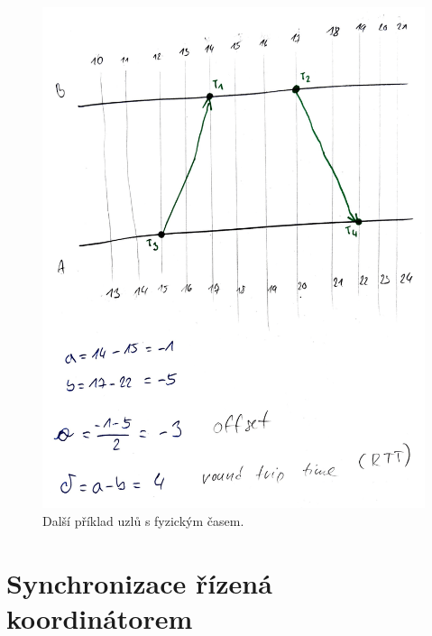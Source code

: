 \begin{compactitem}
    \begin{figure}[H]
        \centering
        \includegraphics[width=1\linewidth]{ntp_priklad_2.png}
        \caption{Další příklad uzlů s fyzickým časem.}
    \end{figure}

\end{compactitem}


\section{Synchronizace řízená koordinátorem}

